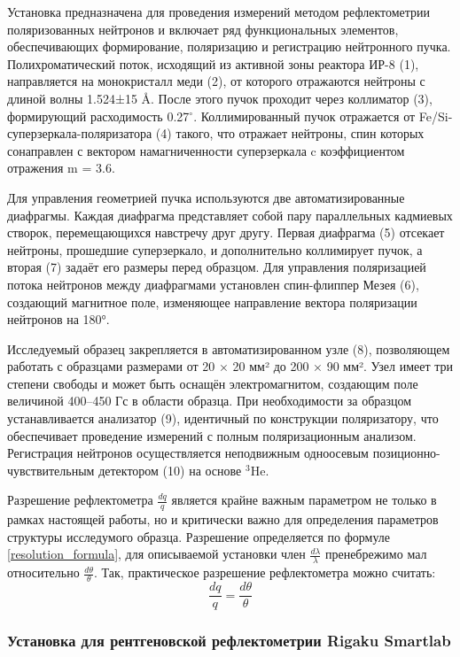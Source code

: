 \documentclass[a4paper]{article}
\begin{document}
Установка предназначена для проведения измерений методом рефлектометрии поляризованных нейтронов и включает ряд функциональных элементов, обеспечивающих формирование, поляризацию и регистрацию нейтронного пучка. Полихроматический поток, исходящий из активной зоны реактора ИР-8 (1), направляется на монокристалл меди (2), от которого отражаются нейтроны с длиной волны 1.524±15 Å. После этого пучок проходит через коллиматор (3), формирующий расходимость 0.27$^\circ $. Коллимированный пучок отражается от Fe/Si-суперзеркала-поляризатора (4) такого, что отражает нейтроны, спин которых сонаправлен с вектором намагниченности суперзеркала c коэффициентом отражения m = 3.6.

Для управления геометрией пучка используются две автоматизированные диафрагмы. Каждая диафрагма представляет собой пару параллельных кадмиевых створок, перемещающихся навстречу друг другу. Первая диафрагма (5) отсекает нейтроны, прошедшие суперзеркало, и дополнительно коллимирует пучок, а вторая (7) задаёт его размеры перед образцом. Для управления поляризацией потока нейтронов между диафрагмами установлен спин-флиппер Мезея (6), создающий магнитное поле, изменяющее направление вектора поляризации нейтронов на 180°.

Исследуемый образец закрепляется в автоматизированном узле (8), позволяющем работать с образцами размерами от 20 × 20 мм² до 200 × 90 мм². Узел имеет три степени свободы и может быть оснащён электромагнитом, создающим поле величиной 400–450 Гс в области образца. При необходимости за образцом устанавливается анализатор (9), идентичный по конструкции поляризатору, что обеспечивает проведение измерений с полным поляризационным анализом. Регистрация нейтронов осуществляется неподвижным одноосевым позиционно-чувствительным детектором (10) на основе $ ^3$He. \cite{29}

Разрешение рефлектометра $\frac{dq}{q} $ является крайне важным параметром не только в рамках настоящей работы, но и критически важно для определения параметров структуры исследумого образца. Разрешение определяется по формуле \ref{resolution_formula}, для описываемой установки член $\frac{d\lambda}{\lambda} $ пренебрежимо мал относительно $\frac{d\theta}{\theta} $. Так, практическое разрешение рефлектометра можно считать:
\begin{equation}
    \frac{dq}{q} = \frac{d\theta}{\theta}
\end{equation}

\subsubsection{Установка для рентгеновской рефлектометрии Rigaku Smartlab}
\end{document}
